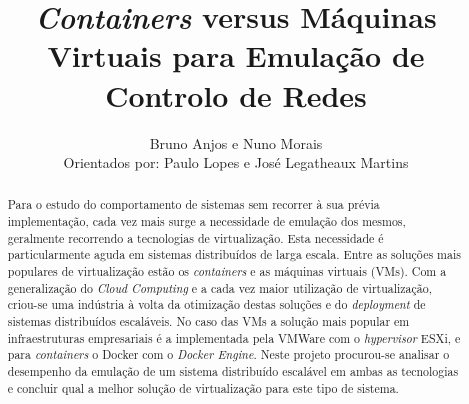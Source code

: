 \documentclass[a4paper]{llncs}
\newcommand{\conts}{\textit{containers}}
\newcommand{\Conts}{\textit{Containers}}
\newcommand{\cldcomp}{\textit{Cloud Computing}}
\newcommand{\hiper}{\textit{hypervisor}}
\begin{document}
\title{{\Conts} versus Máquinas Virtuais para Emulação de Controlo de Redes}
\author{Bruno Anjos e Nuno Morais \\
\vspace{0.2cm}
Orientados por: Paulo Lopes e Jos\'{e} Legatheaux Martins}
\tocauthor{}

           



\maketitle              %


\begin{abstract}
Para o estudo do comportamento de sistemas sem recorrer à sua prévia implementação,
cada vez mais surge a necessidade de emulação dos mesmos, 
geralmente recorrendo a tecnologias de virtualização. 
Esta necessidade é particularmente aguda em sistemas distribuídos de larga escala.
Entre as soluções mais populares de virtualização estão os {\conts} e as máquinas virtuais (VMs).
Com a generalização do{ \cldcomp} e a cada vez maior 
utilização de virtualização, criou-se uma indústria à 
volta da otimização destas soluções e do \textit{deployment} 
de sistemas distribuídos escaláveis.
No caso das VMs a solução
mais popular em infraestruturas empresariais é a implementada pela VMWare com o {\hiper} ESXi,
e para {\conts} o Docker com o \textit{Docker Engine}. 
Neste projeto 
procurou-se analisar o desempenho da emulação de um sistema distribuído escalável
em ambas as tecnologias 
e concluir qual a melhor solução de virtualização para este tipo de sistema.

\end{abstract}

\label{introducao}


\label{virtualizacao}


\label{benchmarks}


\label{testes}


\label{discussao}


\label{relacionado}


\label{fim}






\end{document}

